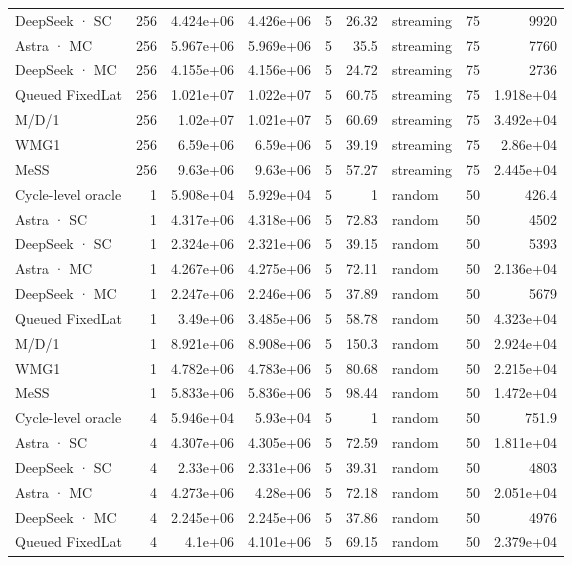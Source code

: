 \begin{tabular}{lrrrrrlrr}
DeepSeek · SC & 256 & 4.424e+06 & 4.426e+06 & 5 & 26.32 & streaming & 75 & 9920 \\
Astra · MC & 256 & 5.967e+06 & 5.969e+06 & 5 & 35.5 & streaming & 75 & 7760 \\
DeepSeek · MC & 256 & 4.155e+06 & 4.156e+06 & 5 & 24.72 & streaming & 75 & 2736 \\
Queued FixedLat & 256 & 1.021e+07 & 1.022e+07 & 5 & 60.75 & streaming & 75 & 1.918e+04 \\
M/D/1 & 256 & 1.02e+07 & 1.021e+07 & 5 & 60.69 & streaming & 75 & 3.492e+04 \\
WMG1 & 256 & 6.59e+06 & 6.59e+06 & 5 & 39.19 & streaming & 75 & 2.86e+04 \\
MeSS & 256 & 9.63e+06 & 9.63e+06 & 5 & 57.27 & streaming & 75 & 2.445e+04 \\
Cycle-level oracle & 1 & 5.908e+04 & 5.929e+04 & 5 & 1 & random & 50 & 426.4 \\
Astra · SC & 1 & 4.317e+06 & 4.318e+06 & 5 & 72.83 & random & 50 & 4502 \\
DeepSeek · SC & 1 & 2.324e+06 & 2.321e+06 & 5 & 39.15 & random & 50 & 5393 \\
Astra · MC & 1 & 4.267e+06 & 4.275e+06 & 5 & 72.11 & random & 50 & 2.136e+04 \\
DeepSeek · MC & 1 & 2.247e+06 & 2.246e+06 & 5 & 37.89 & random & 50 & 5679 \\
Queued FixedLat & 1 & 3.49e+06 & 3.485e+06 & 5 & 58.78 & random & 50 & 4.323e+04 \\
M/D/1 & 1 & 8.921e+06 & 8.908e+06 & 5 & 150.3 & random & 50 & 2.924e+04 \\
WMG1 & 1 & 4.782e+06 & 4.783e+06 & 5 & 80.68 & random & 50 & 2.215e+04 \\
MeSS & 1 & 5.833e+06 & 5.836e+06 & 5 & 98.44 & random & 50 & 1.472e+04 \\
Cycle-level oracle & 4 & 5.946e+04 & 5.93e+04 & 5 & 1 & random & 50 & 751.9 \\
Astra · SC & 4 & 4.307e+06 & 4.305e+06 & 5 & 72.59 & random & 50 & 1.811e+04 \\
DeepSeek · SC & 4 & 2.33e+06 & 2.331e+06 & 5 & 39.31 & random & 50 & 4803 \\
Astra · MC & 4 & 4.273e+06 & 4.28e+06 & 5 & 72.18 & random & 50 & 2.051e+04 \\
DeepSeek · MC & 4 & 2.245e+06 & 2.245e+06 & 5 & 37.86 & random & 50 & 4976 \\
Queued FixedLat & 4 & 4.1e+06 & 4.101e+06 & 5 & 69.15 & random & 50 & 2.379e+04 \\

\end{tabular}
